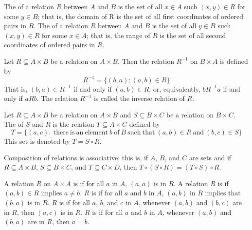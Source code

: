\begin{definition}
  The  of a relation $R$ between $A$ and $B$ is the set of all $x \in A$ such $(x, y) \in R$ for some $y \in B$; that is, the domain of R is the set of all first coordinates of ordered pairs in $R$. The  of a relation $R$ between $A$ and $B$ is the set of all $y \in B$ such $(x, y) \in R$ for some $x \in A$; that is, the range of $R$ is the set of all second coordinates of ordered pairs in $R$.
\end{definition}

\begin{definition}
  Let $R \subseteq A \times B$ be a relation on $A \times B$. Then the relation $R^{-1}$ on $B \times A$ is defined by
  \[R^{-1} = \{(b, a): (a, b) \in R\}\]
  That is, $(b, a) \in R^{-1}$ if and only if $(a, b) \in R$; or, equivalently, $bR^{-1}a$ if and only if $aRb$. The relation $R^{-1}$ is called the inverse relation of $R$.
\end{definition}

\begin{definition}
  Let $R \subseteq A \times B$ be a relation on $A \times B$ and $S \subseteq B \times C$ be a relation on $B \times C$. The  of $S$ and $R$ is the relation $T \subseteq A \times C$ defined by
  \[T = \{(a, c):\ \mathrm{there\ is\ an\ element}\ b\ \mathrm{of}\ B\ \mathrm{such\ that}\ (a, b) \in R\ \mathrm{and}\ (b, c) \in S \}\]
  This set is denoted by $T = S \circ R$.
\end{definition}

\begin{theorem}
  Composition of relations is associative; this is, if $A$, $B$, and $C$ are sets and if $R \subseteq A \times B$, $S \subseteq B \times C$, and $T \subseteq C \times D$, then $T \circ (S \circ R) = (T \circ S) \circ R$.
\end{theorem}

\begin{definition}
  A relation $R$ on $A \times A$ is  if for all $a$ in $A$, $(a, a)$ is in $R$. A relation $R$ is  if $(a, b) \in R$ implies $a \neq b$. $R$ is  if for all $a$ and $b$ in $A$, $(a, b)$ in $R$ implies that $(b, a)$ is in $R$. $R$ is  if for all $a$, $b$, and $c$ in $A$, whenever $(a, b)$ and $(b, c)$ are in $R$, then $(a, c)$ is in $R$. $R$ is  if for all $a$ and $b$ in $A$, whenever $(a, b)$ and $(b, a)$ are in $R$, then $a = b$.
\end{definition}